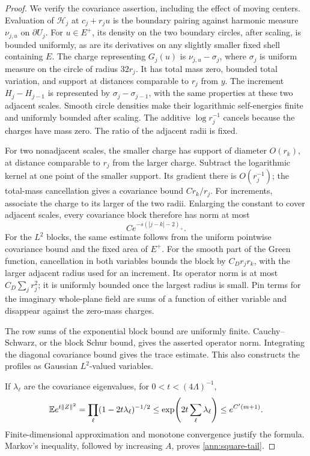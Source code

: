 \begin{proof}
We verify the covariance assertion, including the effect of moving
centers.  Evaluation of \(\mathcal H_j\) at \(c_j+r_ju\)
is the boundary pairing against harmonic measure
\(\nu_{j,u}\) on \(\partial U_j\).  For \(u\in E^+\), its
density on the two boundary circles, after scaling, is bounded
uniformly, as are its derivatives on any slightly smaller fixed
shell containing \(E\).  The charge representing \(G_j(u)\)
is \(\nu_{j,u}-\sigma_j\), where \(\sigma_j\) is uniform measure
on the circle of radius \(32r_j\).  It has total mass zero,
bounded total variation, and support at distances comparable to
\(r_j\) from \(y\).  The increment \(H_j-H_{j-1}\) is represented
by \(\sigma_j-\sigma_{j-1}\), with the same properties at these
two adjacent scales.  Smooth circle densities make their logarithmic
self-energies finite and uniformly bounded after scaling.  The
additive \(\log r_j^{-1}\) cancels because the charges have mass
zero.  The ratio of the adjacent radii is fixed.

For two nonadjacent scales, the smaller charge has support of
diameter \(O(r_k)\), at distance comparable to \(r_j\) from
the larger charge.  Subtract the logarithmic kernel at one point
of the smaller support.  Its gradient there is \(O(r_j^{-1})\);
the total-mass cancellation gives a covariance bound
\(C r_k/r_j\).  For increments, associate the charge to its
larger of the two radii.  Enlarging the constant to cover adjacent
scales, every covariance block therefore has norm at most
\[
 C e^{-s(|j-k|-2)_+}.
\]
For the \(L^2\) blocks, the same estimate follows from the uniform
pointwise covariance bound and the fixed area of \(E^+\).
For the smooth part of the Green function, cancellation in both
variables bounds the block by \(C_Dr_jr_k\), with the larger
adjacent radius used for an increment.  Its operator norm is at
most \(C_D\sum_jr_j^2\); it is uniformly bounded once the largest
radius is small.  Pin terms for the imaginary whole-plane field
are sums of a function of either variable and disappear against
the zero-mass charges.

The row sums of the exponential block bound are uniformly finite.
Cauchy--Schwarz, or the block Schur bound, gives the asserted operator
norm.  Integrating the diagonal covariance bound gives the trace
estimate.  This also constructs the profiles as Gaussian
\(L^2\)-valued variables.

If \(\lambda_\ell\) are the covariance eigenvalues, for
\(0<t<(4\Lambda)^{-1}\),
\[
 \mathbb E e^{t\|Z\|^2}
 =\prod_\ell(1-2t\lambda_\ell)^{-1/2}
 \le \exp\!\left(2t\sum_\ell\lambda_\ell\right)
 \le e^{C'(m+1)}.
\]
Finite-dimensional approximation and monotone convergence justify
the formula.  Markov's inequality, followed by increasing \(A\),
proves \eqref{ann:square-tail}.
\end{proof}


